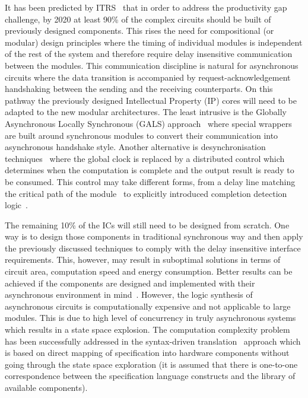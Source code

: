 It has been predicted by ITRS~\cite{ITRS_2011} that in order to address the productivity gap challenge, by 2020 at least 90\% of the complex circuits should be built of previously designed components. This rises the need for compositional (or modular) design principles where the timing of individual modules is independent of the rest of the system and  therefore require delay insensitive communication between the modules. This communication discipline is natural for asynchronous circuits where the data transition is accompanied by request-acknowledgement handshaking between the sending and the receiving counterparts. On this pathway the previously designed Intellectual Property (IP) cores will need to be adapted to the new modular architectures. The least intrusive is the Globally Asynchronous Locally Synchronous (GALS) approach~\cite{Chapiro_1984_phd} where special wrappers~\cite{Mullins_2007_async, Fan_2009_iccd} are built around synchronous modules to convert their communication into asynchronous handshake style. Another alternative is desynchronisation techniques~\cite{Cortadella_2006_ieeetcad} where the global clock is replaced by a distributed control which determines when the computation is complete and the output result is ready to be consumed. This control may take different forms, from a delay line matching the critical path of the module~\cite{Cortadella_2010_icicdt } to explicitly introduced completion detection logic~\cite{Kondratiev_2002_ieeedtc}.

The remaining 10\% of the ICs will still need to be designed from scratch. One way is to design those components in traditional synchronous way and then apply the previously discussed techniques to comply with the delay insensitive interface requirements. This, however, may result in suboptimal solutions in terms of circuit area, computation speed and energy consumption. Better results can be achieved if the components are designed and implemented with their asynchronous environment in mind~\cite{Martin_2006_ieeeproc}. However, the logic synthesis of asynchronous circuits is computationally expensive and not applicable to large modules. This is due to high level of concurrency in truly asynchronous systems which results in a state space explosion.  The computation complexity problem has been successfully addressed in the syntax-driven translation~\cite{Tangram-or-Balsa-paper?} approach which is based on direct mapping of specification into hardware components without going through the state space exploration (it is assumed that there is one-to-one correspondence between the specification language constructs and the library of available components).

